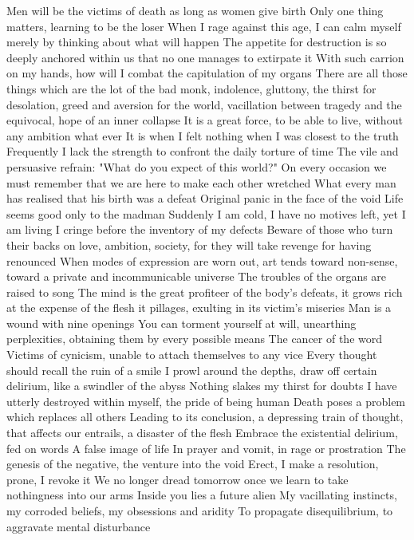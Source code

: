\documentclass{article}
\begin{document}
Men will be the victims of death as long as women give birth
Only one thing matters, learning to be the loser
When I rage against this age, I can calm myself merely by thinking about what will happen
The appetite for destruction is so deeply anchored within us that no one manages to extirpate it
With such carrion on my hands, how will I combat the capitulation of my organs
There are all those things which are the lot of the bad monk, indolence, gluttony, the thirst for desolation, greed and aversion for the world, vacillation between tragedy and the equivocal, hope of an inner collapse
It is a great force, to be able to live, without any ambition what ever
It is when I felt nothing when I was closest to the truth
Frequently I lack the strength to confront the daily torture of time
The vile and persuasive refrain: "What do you expect of this world?"
On every occasion we must remember that we are here to make each other wretched
What every man has realised that his birth was a defeat
Original panic in the face of the void
Life seems good only to the madman
Suddenly I am cold, I have no motives left, yet I am living
I cringe before the inventory of my defects
Beware of those who turn their backs on love, ambition, society, for they will take revenge for having renounced
When modes of expression are worn out, art tends toward non-sense, toward a private and incommunicable universe
The troubles of the organs are raised to song
The mind is the great profiteer of the body's defeats, it grows rich at the expense of the flesh it pillages, exulting in its victim's miseries
Man is a wound with nine openings
You can torment yourself at will, unearthing perplexities, obtaining them by every possible means
The cancer of the word
Victims of cynicism, unable to attach themselves to any vice
Every thought should recall the ruin of a smile
I prowl around the depths, draw off certain delirium, like a swindler of the abyss
Nothing slakes my thirst for doubts
I have utterly destroyed within myself, the pride of being human
Death poses a problem which replaces all others
Leading to its conclusion, a depressing train of thought, that affects our entrails, a disaster of the flesh
Embrace the existential delirium, fed on words
A false image of life
In prayer and vomit, in rage or prostration
The genesis of the negative, the venture into the void
Erect, I make a resolution, prone, I revoke it
We no longer dread tomorrow once we learn to take nothingness into our arms
Inside you lies a future alien
My vacillating instincts, my corroded beliefs, my obsessions and aridity
To propagate disequilibrium, to aggravate mental disturbance
\end{document}

